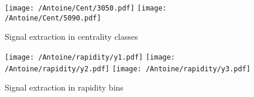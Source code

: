 \begin{figure}[!h]
  \texttt{[image: /Antoine/Cent/3050.pdf]}
  \texttt{[image: /Antoine/Cent/5090.pdf]}
    \caption{ \label{AntoineSigCent}Signal extraction in centrality classes}
\end{figure}       

\begin{figure}[!h]
  \texttt{[image: /Antoine/rapidity/y1.pdf]}
  \texttt{[image: /Antoine/rapidity/y2.pdf]}
  \texttt{[image: /Antoine/rapidity/y3.pdf]}
      \caption{\label{AntoineSigY}Signal extraction in rapidity bins}
\end{figure}       






